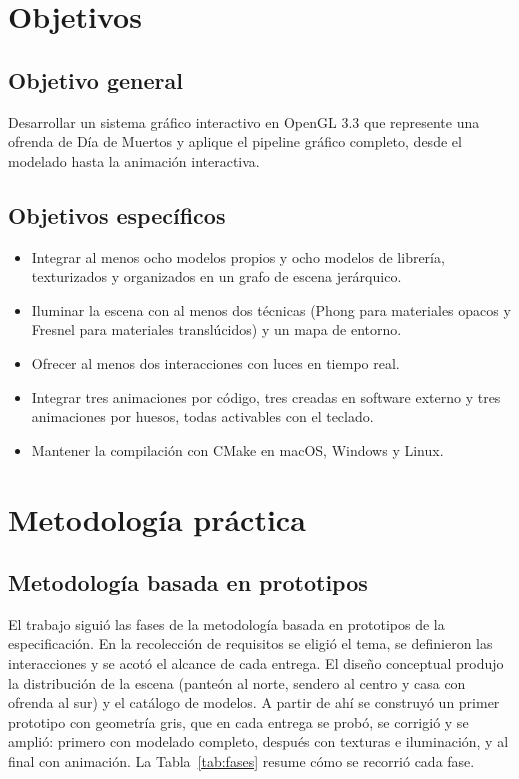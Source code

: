 \documentclass[letter,12pt]{article}
\begin{document}
	\section{Objetivos}
	\subsection{Objetivo general}
	Desarrollar un sistema gráfico interactivo en OpenGL 3.3 que represente una ofrenda de Día de Muertos y aplique el pipeline gráfico completo, desde el modelado hasta la animación interactiva.

	\subsection{Objetivos específicos}
	\begin{itemize}[leftmargin=*]
		\item Integrar al menos ocho modelos propios y ocho modelos de librería, texturizados y organizados en un grafo de escena jerárquico.
		\item Iluminar la escena con al menos dos técnicas (Phong para materiales opacos y Fresnel para materiales translúcidos) y un mapa de entorno.
		\item Ofrecer al menos dos interacciones con luces en tiempo real.
		\item Integrar tres animaciones por código, tres creadas en software externo y tres animaciones por huesos, todas activables con el teclado.
		\item Mantener la compilación con CMake en macOS, Windows y Linux.
	\end{itemize}

	\section{Metodología práctica}

	\subsection{Metodología basada en prototipos}
	El trabajo siguió las fases de la metodología basada en prototipos de la especificación. En la recolección de requisitos se eligió el tema, se definieron las interacciones y se acotó el alcance de cada entrega. El diseño conceptual produjo la distribución de la escena (panteón al norte, sendero al centro y casa con ofrenda al sur) y el catálogo de modelos. A partir de ahí se construyó un primer prototipo con geometría gris, que en cada entrega se probó, se corrigió y se amplió: primero con modelado completo, después con texturas e iluminación, y al final con animación. La Tabla~\ref{tab:fases} resume cómo se recorrió cada fase.
\end{document}
